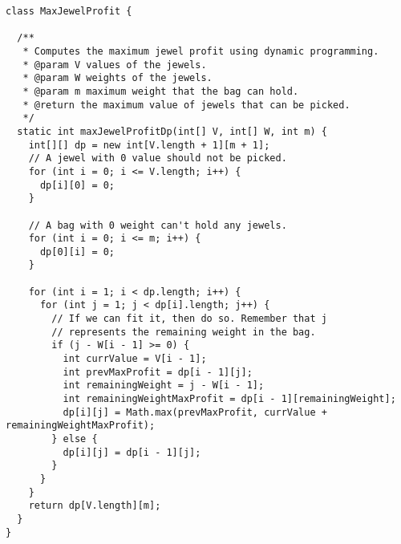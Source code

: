 \begin{lstlisting}[language=MyJava]
class MaxJewelProfit {
  
  /**
   * Computes the maximum jewel profit using dynamic programming.
   * @param V values of the jewels.
   * @param W weights of the jewels.
   * @param m maximum weight that the bag can hold.
   * @return the maximum value of jewels that can be picked.
   */
  static int maxJewelProfitDp(int[] V, int[] W, int m) {
    int[][] dp = new int[V.length + 1][m + 1];
    // A jewel with 0 value should not be picked.
    for (int i = 0; i <= V.length; i++) { 
      dp[i][0] = 0; 
    }

    // A bag with 0 weight can't hold any jewels.
    for (int i = 0; i <= m; i++) { 
      dp[0][i] = 0; 
    }

    for (int i = 1; i < dp.length; i++) {
      for (int j = 1; j < dp[i].length; j++) {
        // If we can fit it, then do so. Remember that j 
        // represents the remaining weight in the bag.
        if (j - W[i - 1] >= 0) {
          int currValue = V[i - 1];
          int prevMaxProfit = dp[i - 1][j];
          int remainingWeight = j - W[i - 1];
          int remainingWeightMaxProfit = dp[i - 1][remainingWeight];
          dp[i][j] = Math.max(prevMaxProfit, currValue + remainingWeightMaxProfit);
        } else {
          dp[i][j] = dp[i - 1][j];
        }
      }
    }
    return dp[V.length][m];
  }
}
\end{lstlisting}
